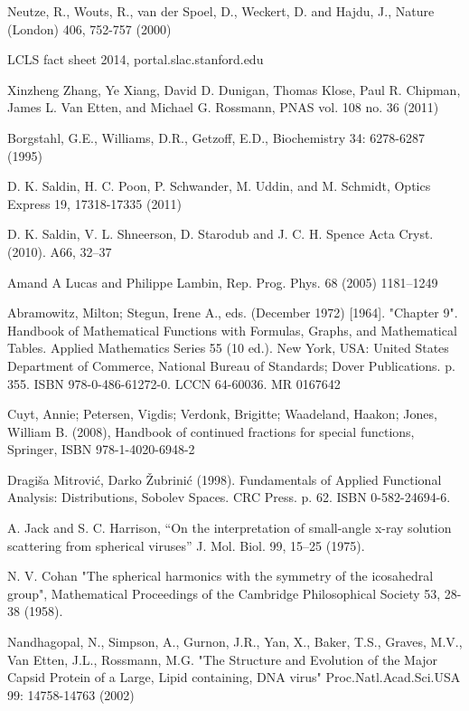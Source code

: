 \renewcommand\bibname{References}
\begin{thebibliography}{99}
 Neutze, R., Wouts, R., van der Spoel, D., Weckert, D. and Hajdu, J., Nature (London) 406, 752-757 (2000)

 LCLS fact sheet 2014, portal.slac.stanford.edu

 Xinzheng Zhang, Ye Xiang, David D. Dunigan, Thomas Klose, Paul R. Chipman, James L. Van Etten, and Michael G. Rossmann, PNAS vol. 108 no. 36 (2011)

 Borgstahl, G.E.,  Williams, D.R.,  Getzoff, E.D., Biochemistry 34: 6278-6287 (1995) 

 D. K. Saldin, H. C. Poon, P. Schwander, M. Uddin, and M. Schmidt, Optics Express 19, 17318-17335 (2011)

 D. K. Saldin, V. L. Shneerson, D. Starodub and J. C. H. Spence Acta Cryst. (2010). A66, 32–37

 Amand A Lucas and Philippe Lambin, Rep. Prog. Phys. 68 (2005) 1181–1249

 Abramowitz, Milton; Stegun, Irene A., eds. (December 1972) [1964]. "Chapter 9". Handbook of Mathematical Functions with Formulas, Graphs, and Mathematical Tables. Applied Mathematics Series 55 (10 ed.). New York, USA: United States Department of Commerce, National Bureau of Standards; Dover Publications. p. 355. ISBN 978-0-486-61272-0. LCCN 64-60036. MR 0167642

Cuyt, Annie; Petersen, Vigdis; Verdonk, Brigitte; Waadeland, Haakon; Jones, William B. (2008), Handbook of continued fractions for special functions, Springer, ISBN 978-1-4020-6948-2

Dragiša Mitrović, Darko Žubrinić (1998). Fundamentals of Applied Functional Analysis: Distributions, Sobolev Spaces. CRC Press. p. 62. ISBN 0-582-24694-6.

A. Jack and S. C. Harrison, “On the interpretation of small-angle x-ray solution scattering from spherical viruses” J. Mol. Biol. 99, 15–25 (1975).

 N. V. Cohan "The spherical harmonics with the symmetry of the icosahedral group", Mathematical Proceedings of the Cambridge Philosophical Society 53, 28-38 (1958).

 Nandhagopal, N., Simpson, A., Gurnon, J.R., Yan, X., Baker, T.S., Graves, M.V., Van Etten, J.L., Rossmann, M.G. "The Structure and Evolution of the Major Capsid Protein of a Large, Lipid containing, DNA virus" Proc.Natl.Acad.Sci.USA 99: 14758-14763 (2002) 


\end{thebibliography}
